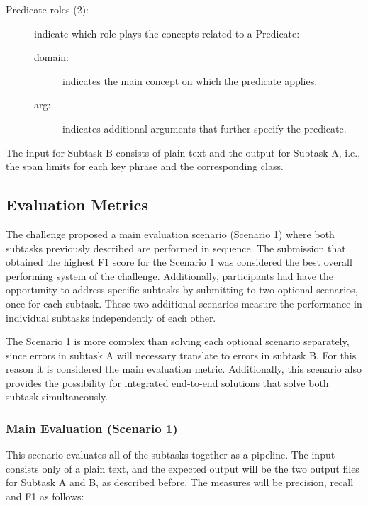 \documentclass[11pt,a4paper]{article}
\begin{document}
\begin{description}
    \item[Predicate roles (2):] indicate which role plays the concepts related to a Predicate:

    \begin{description}
        \item[domain:] indicates the main concept on which the predicate applies.
        \item[arg:] indicates additional arguments that further specify the predicate.
    \end{description}
\end{description}


The input for Subtask B consists of plain text and the output for Subtask A, i.e., the span limits for each key phrase and the corresponding class.

\subsection{Evaluation Metrics}

The challenge proposed a main evaluation scenario (Scenario 1) where both subtasks previously described are performed in sequence. The submission that obtained the highest F1 score for the Scenario 1 was considered the best overall performing system of the challenge. Additionally, participants had have the opportunity to address specific subtasks by submitting to two optional scenarios, once for each subtask. These two additional scenarios measure the performance in individual subtasks independently of each other.

The Scenario 1 is more complex than solving each optional scenario separately, since errors in subtask A will necessary translate to errors in subtask B. For this reason it is considered the main evaluation metric. Additionally, this scenario also provides the possibility for integrated end-to-end solutions that solve both subtask simultaneously.

\subsubsection{Main Evaluation (Scenario 1)}

This scenario evaluates all of the subtasks together as a pipeline. The input consists only of a plain text, and the expected output will be the two output files for Subtask A and B, as described before. The measures will be precision, recall and F1 as follows:
\end{document}
